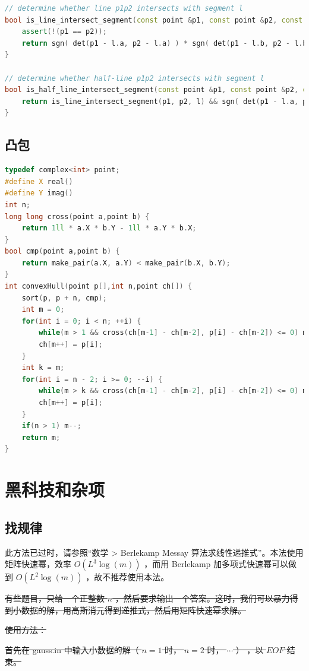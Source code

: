 \documentclass{article}
\begin{document}
\begin{lstlisting}[language=C++]
// determine whether line p1p2 intersects with segment l
bool is_line_intersect_segment(const point &p1, const point &p2, const segment &l) {
	assert(!(p1 == p2));
	return sgn( det(p1 - l.a, p2 - l.a) ) * sgn( det(p1 - l.b, p2 - l.b) ) <= 0;
}

// determine whether half-line p1p2 intersects with segment l
bool is_half_line_intersect_segment(const point &p1, const point &p2, const segment &l) {
	return is_line_intersect_segment(p1, p2, l) && sgn( det(p1 - l.a, p2 - l.a) ) * sgn( det(p1 - l.a, l.b - l.a) ) >= 0;
}

\end{lstlisting}

\subsection{凸包}
\begin{lstlisting}[language=C++]
typedef complex<int> point;
#define X real()
#define Y imag()
int n;
long long cross(point a,point b) {
	return 1ll * a.X * b.Y - 1ll * a.Y * b.X;
}
bool cmp(point a,point b) {
	return make_pair(a.X, a.Y) < make_pair(b.X, b.Y);
}
int convexHull(point p[],int n,point ch[]) {
	sort(p, p + n, cmp);
	int m = 0;
	for(int i = 0; i < n; ++i) {
		while(m > 1 && cross(ch[m-1] - ch[m-2], p[i] - ch[m-2]) <= 0) m--;
		ch[m++] = p[i];
	}
	int k = m;
	for(int i = n - 2; i >= 0; --i) {
		while(m > k && cross(ch[m-1] - ch[m-2], p[i] - ch[m-2]) <= 0) m--;
		ch[m++] = p[i];
	}
	if(n > 1) m--;
	return m;
}
\end{lstlisting}
\section{黑科技和杂项}
\subsection{找规律}

此方法已过时，请参照“数学 > Berlekamp Messay 算法求线性递推式”。本法使用矩阵快速幂，效率 $O(L^3\log{(m)})$ ，而用 Berlekamp 加多项式快速幂可以做到 $O(L^2\log{(m)})$ ，故不推荐使用本法。

\sout{有些题目，只给一个正整数 $n$ ，然后要求输出一个答案。这时，我们可以暴力得到小数据的解，用高斯消元得到递推式，然后用矩阵快速幂求解。}

\sout{使用方法： }

\sout{首先在 gauss.in 中输入小数据的解（ $n = 1$ 时， $n = 2$ 时， $\cdots$ ） ，以 $EOF$ 结束。 }
\end{document}

